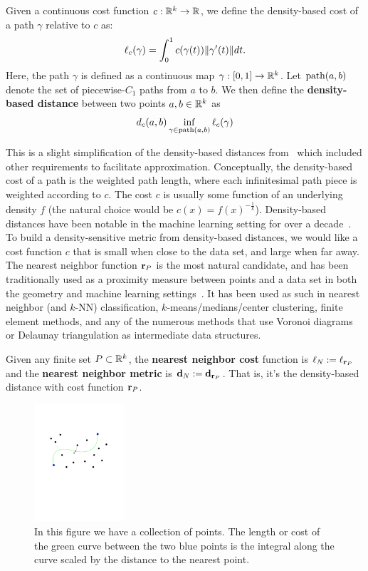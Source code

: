 \begin{definition}
Given a continuous cost function $c:\mathbb{R}^k \rightarrow \mathbb{R}$, we define the density-based
cost of a path $\gamma$ relative to $c$ as:
\[ \ell_c(\gamma) = \int_{0}^1 c(\gamma(t)) \| \gamma'(t) \|dt. \]
Here, the path $\gamma$ is defined as a continuous map $\gamma:[0,1]
\to \mathbb{R}^k$.
Let $\mathrm{path}(a,b)$ denote the set of piecewise-$C_1$ paths from $a$ to $b$.
We then define the \textbf{density-based distance} between two points $a, b \in
\mathbb{R}^k$ as
\[ d_c(a,b) \inf_{\gamma\in\mathrm{path}(a,b)} \ell_c(\gamma)\]
\end{definition}

This is a slight simplification of the density-based distances from~\cite{sajama05estimatingDBDM} which included other requirements to facilitate approximation.
Conceptually, the density-based cost of a path is the weighted path length,
where each infinitesimal path piece is weighted according to $c$.  The cost
$c$ is usually some function of an underlying density $f$ (the natural
choice would be $c(x) = f(x)^{-\frac{1}{k}}$).  Density-based distances
have been notable in the machine learning setting for over a
decade~\cite{sajama05estimatingDBDM,bijral11semiSupLearningDBD}.  To build
a density-sensitive metric from density-based distances, we would like a
cost function $c$ that is small when close to the data set, and large when
far away.  The nearest neighbor function $\mathbf{r}_P$ is the most natural
candidate, and has been traditionally used as a proximity measure between
points and a data set in both the geometry and machine learning
settings~\cite{bijral11semiSupLearningDBD}. It has been used as such in
nearest neighbor (and $k$-NN) classification, $k$-means/medians/center
clustering, finite element methods, and any of the numerous methods that
use Voronoi diagrams or Delaunay triangulation as intermediate data
structures.

\begin{definition} Given any finite set $P\subset \mathbb{R}^k$, the \textbf{nearest neighbor cost} function is $\ell_N := \ell_{\mathbf{r}_P}$ and the \textbf{nearest neighbor metric} is $\mathbf{d}_N := \mathbf{d}_{\mathbf{r}_P}$.  That is, it's the density-based distance with cost function $\mathbf{r}_P$.
\end{definition}
\begin{figure}[htbp]
  \centering
    \includegraphics[width=0.3\textwidth]{Figures/example.pdf}
    \caption{In this figure we have a collection of points.
      The length or cost of the green curve between the two blue points
      is the integral along the curve scaled by the distance to the nearest
point.}
  \label{fig:example}
\end{figure}

